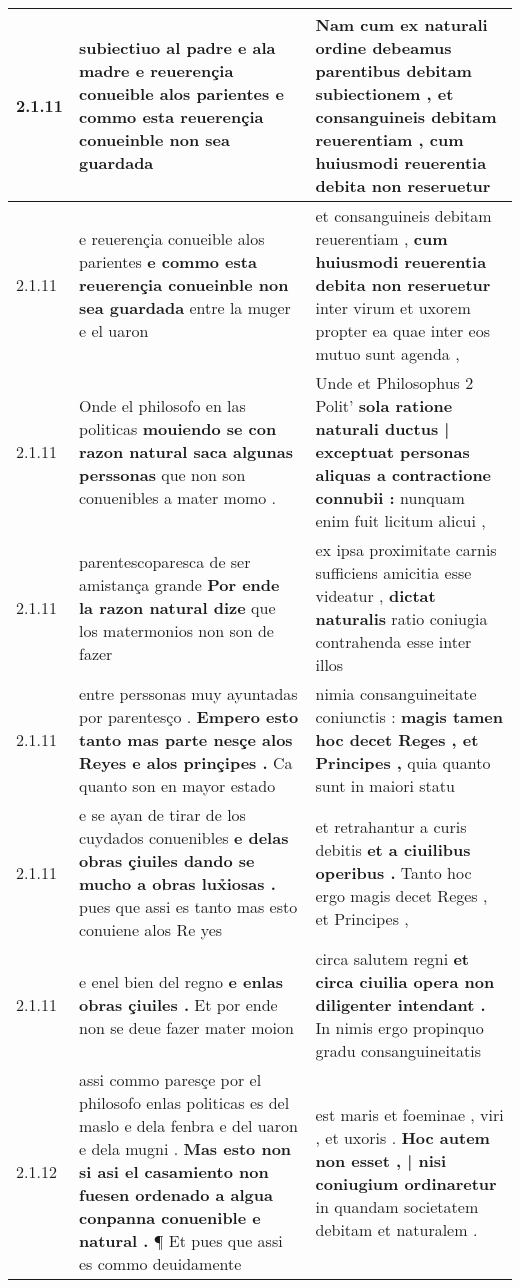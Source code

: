 \begin{tabular}{|p{1cm}|p{6.5cm}|p{6.5cm}|}
2.1.11 & subiectiuo al padre e ala madre \textbf{ e reuerençia conueible alos parientes } e commo esta reuerençia conueinble non sea guardada & Nam cum ex naturali ordine debeamus parentibus debitam subiectionem , \textbf{ et consanguineis debitam reuerentiam , } cum huiusmodi reuerentia debita non reseruetur \\\hline
2.1.11 & e reuerençia conueible alos parientes \textbf{ e commo esta reuerençia conueinble non sea guardada } entre la muger e el uaron & et consanguineis debitam reuerentiam , \textbf{ cum huiusmodi reuerentia debita non reseruetur } inter virum et uxorem propter ea quae inter eos mutuo sunt agenda , \\\hline
2.1.11 & Onde el philosofo en las politicas \textbf{ mouiendo se con razon natural saca algunas perssonas } que non son conuenibles a mater momo . & Unde et Philosophus 2 Polit’ \textbf{ sola ratione naturali ductus | exceptuat personas aliquas a contractione connubii : } nunquam enim fuit licitum alicui , \\\hline
2.1.11 & parentescoparesca de ser amistança grande \textbf{ Por ende la razon natural dize } que los matermonios non son de fazer & ex ipsa proximitate carnis sufficiens amicitia esse videatur , \textbf{ dictat naturalis } ratio coniugia contrahenda esse inter illos \\\hline
2.1.11 & entre perssonas muy ayuntadas por parentesço . \textbf{ Empero esto tanto mas parte nesçe alos Reyes e alos prinçipes . } Ca quanto son en mayor estado & nimia consanguineitate coniunctis : \textbf{ magis tamen hoc decet Reges , et Principes , } quia quanto sunt in maiori statu \\\hline
2.1.11 & e se ayan de tirar de los cuydados conuenibles \textbf{ e delas obras çiuiles dando se mucho a obras lux̉iosas . } pues que assi es tanto mas esto conuiene alos Re yes & et retrahantur a curis debitis \textbf{ et a ciuilibus operibus . } Tanto hoc ergo magis decet Reges , et Principes , \\\hline
2.1.11 & e enel bien del regno \textbf{ e enlas obras çiuiles . } Et por ende non se deue fazer mater moion & circa salutem regni \textbf{ et circa ciuilia opera non diligenter intendant . } In nimis ergo propinquo gradu consanguineitatis \\\hline
2.1.12 & assi commo paresçe por el philosofo enlas politicas es del maslo e dela fenbra e del uaron e dela mugni . \textbf{ Mas esto non si asi el casamiento non fuesen ordenado a algua conpanna conuenible e natural . } ¶ Et pues que assi es commo deuidamente & est maris et foeminae , viri , et uxoris . \textbf{ Hoc autem non esset , | nisi coniugium ordinaretur } in quandam societatem debitam et naturalem . \\\hline

\end{tabular}
